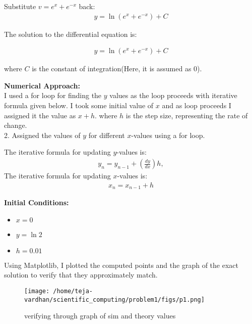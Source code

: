 \documentclass[article]{IEEEtran}
\numberwithin{figure}{enumi}
\begin{document}
\noindent Substitute $v = e^x + e^{-x}$ back:
\begin{align}
   y = \ln(e^x + e^{-x}) + C
\end{align}

\noindent The solution to the differential equation is:

\begin{align}
  \boxed{y = \ln(e^x + e^{-x}) + C}
\end{align}



where $C$ is the constant of integration(Here, it is assumed as 0).

\vspace{0.5em}

\noindent\textbf{Numerical Approach:}\\ I used a for loop for finding the $y$ values as the loop proceeds with iterative formula given below. I took some initial value of $x$ and as loop proceeds I assigned it the value as $x+h$. where $h$ is the step size, representing the rate of change. 
\\2. Assigned the values of $y$ for different $x$-values using a for loop.  

\noindent The iterative formula for updating $y$-values is:  
\begin{align}
    y_n = y_{n-1} + \left(\frac{dy}{dx}\right) h,
\end{align}
The iterative formula for updating $x$-values is: 
\begin{align}
    x_n=x_{n-1}+h
\end{align} 

\noindent\textbf{Initial Conditions:}  
\begin{itemize}
    \item $x = 0$  
    \item $y = \ln2$  
    \item $h = 0.01$  
\end{itemize}

Using Matplotlib, I plotted the computed points and the graph of the exact solution to verify that they approximately match.
\begin{figure}[h!]
	\centering
	\texttt{[image: /home/teja-vardhan/scientific\_computing/problem1/figs/p1.png]}
	\caption{verifying through graph of sim and theory values}
	\label{stemplot}
\end{figure}	
\end{document}

